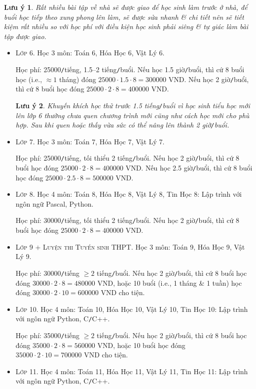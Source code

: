 \documentclass{article}
\numberwithin{equation}{section}
\newtheorem{luuy}{Lưu ý}
\begin{document}
\begin{luuy}
	Rất nhiều bài tập về nhà sẽ được giao để học sinh làm trước ở nhà, để buổi học tiếp theo xung phong lên làm, sẽ được sửa nhanh \& chi tiết nên sẽ tiết kiệm rất nhiều so với học phí với điều kiện học sinh phải siêng \& tự giác làm bài tập được giao.
\end{luuy}
\begin{itemize}
	\item \textsc{Lớp 6.} Học 3 môn: Toán 6, Hóa Học 6, Vật Lý 6.
	
	{\sf Học phí:} 25000{\tt/}tiếng, 1.5--2 tiếng{\tt/}buổi. Nếu học 1.5 giờ{\tt/}buổi, thì cứ 8 buổi học (i.e., $\approx1$ tháng) đóng $25000\cdot1.5\cdot8 = 300000$ VND. Nếu học 2 giờ{\tt/}buổi, thì cứ 8 buổi học đóng $25000\cdot2\cdot8 = 400000$ VND.
	
	\begin{luuy}
		Khuyến khích học thử trước 1.5 tiếng{\tt/}buổi vì học sinh tiểu học mới lên lớp 6 thường chưa quen chương trình mới cũng như cách học mới cho phù hợp. Sau khi quen hoặc thấy vừa sức có thể nâng lên thành 2 giờ{\tt/}buổi.
	\end{luuy}
	\item \textsc{Lớp 7.} Học 3 môn: Toán 7, Hóa Học 7, Vật Lý 7.
	
	{\sf Học phí:} 25000{\tt/}tiếng, tối thiểu 2 tiếng{\tt/}buổi. Nếu học 2 giờ{\tt/}buổi, thì cứ 8 buổi học đóng $25000\cdot2\cdot8 = 400000$ VND. Nếu học 2.5 giờ{\tt/}buổi, thì cứ 8 buổi học đóng $25000\cdot2.5\cdot8 = 500000$ VND. 
	\item \textsc{Lớp 8.} Học 4 môn: Toán 8, Hóa Học 8, Vật Lý 8, Tin Học 8: Lập trình với ngôn ngữ Pascal, Python.
	
	{\sf Học phí:} 30000{\tt/}tiếng, tối thiểu 2 tiếng{\tt/}buổi. Nếu học 2 giờ{\tt/}buổi, thì cứ 8 buổi học đóng $25000\cdot2\cdot8 = 400000$ VND.
	\item \textsc{Lớp 9 $+$ Luyện thi Tuyển sinh THPT.} Học 3 môn: Toán 9, Hóa Học 9, Vật Lý 9.
	
	{\sf Học phí:} 30000{\tt/}tiếng $\ge2$ tiếng{\tt/}buổi. Nếu học 2 giờ{\tt/}buổi, thì cứ 8 buổi học đóng $30000\cdot2\cdot8 = 480000$ VND, hoặc 10 buổi (i.e., 1 tháng \& 1 tuần) học đóng $30000\cdot2\cdot10 = 600000$ VND cho tiện.
	\item \textsc{Lớp 10.} Học 4 môn: Toán 10, Hóa Học 10, Vật Lý 10, Tin Học 10: Lập trình với ngôn ngữ Python, C{\tt/}C++.
	
	{\sf Học phí:} 35000{\tt/}tiếng $\ge2$ tiếng{\tt/}buổi. Nếu học 2 giờ{\tt/}buổi, thì cứ 8 buổi học đóng $35000\cdot2\cdot8 = 560000$ VND, hoặc 10 buổi học đóng $35000\cdot2\cdot10 = 700000$ VND cho tiện.
	\item \textsc{Lớp 11.} Học 4 môn: Toán 11, Hóa Học 11, Vật Lý 11, Tin Học 11: Lập trình với ngôn ngữ Python, C{\tt/}C++.
	

\end{itemize}
\end{document}
